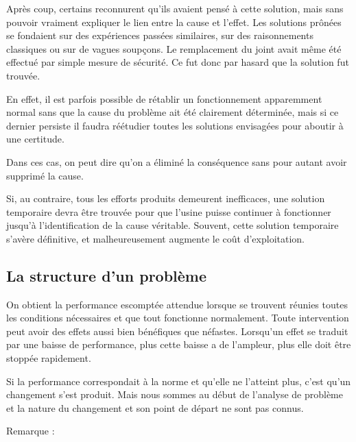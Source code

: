 Après coup, certains reconnurent qu’ils avaient pensé à cette solution, mais sans pouvoir vraiment expliquer le lien entre la cause et l’effet. Les solutions prônées se fondaient sur des expériences passées similaires, sur des raisonnements classiques ou sur de vagues soupçons. Le remplacement du joint avait même été effectué par simple mesure de sécurité. Ce fut donc par hasard que la solution fut trouvée.

\vspace{0.3cm}

En effet, il est parfois possible de rétablir un fonctionnement apparemment normal sans que la cause du problème ait été clairement déterminée, mais si ce dernier persiste il faudra réétudier toutes les solutions envisagées pour aboutir à une certitude.
\vspace{0.3cm}

Dans ces cas, on peut dire qu’on a éliminé la conséquence sans pour autant avoir supprimé la cause.
\vspace{0.3cm}

Si, au contraire, tous les efforts produits demeurent inefficaces, une solution temporaire devra être trouvée pour que l’usine puisse continuer à fonctionner jusqu’à l’identification de la cause véritable. Souvent, cette solution temporaire s’avère définitive, et malheureusement augmente le coût d’exploitation.






\subsection{La structure d’un problème}

On obtient la performance escomptée attendue lorsque se trouvent réunies toutes les conditions nécessaires et que tout fonctionne normalement. Toute intervention peut avoir des effets aussi bien bénéfiques que néfastes. Lorsqu’un effet se traduit par une baisse de performance, plus cette baisse a de l’ampleur, plus elle doit être stoppée rapidement.
\vspace{0.3cm}

Si la performance correspondait à la norme et qu’elle ne l’atteint plus, c’est qu’un changement s’est produit. Mais nous sommes au début de l’analyse de problème et la nature du changement et son point de départ ne sont pas connus.
\vspace{0.3cm}

Remarque : 
\vspace{0.3cm}

